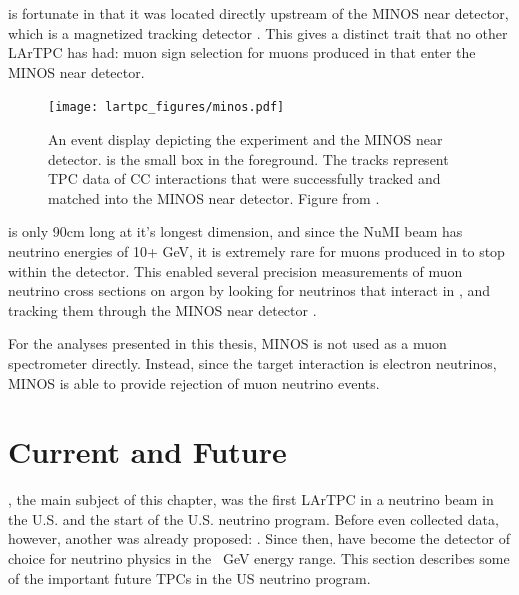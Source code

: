 \argoneut is fortunate in that it was located directly upstream of the MINOS near detector, which is a magnetized tracking detector \cite{Michael:2008bc}.  This gives \argoneut a distinct trait that no other LArTPC has had: muon sign selection for muons produced in \argoneut that enter the MINOS near detector.

\begin{figure}[htb]
  \centering
  \texttt{[image: lartpc\_figures/minos.pdf]}
  \caption[\argoneut and MINOS]{An event display depicting the \argoneut experiment and the MINOS near detector. \argoneut is the small box in the foreground.  The tracks represent TPC data of \numu CC interactions that were successfully tracked and matched into the MINOS near detector.  Figure from \cite{Anderson:2012vc}.}
  \label{fig:minos}
\end{figure}

\argoneut is only 90cm long at it's longest dimension, and since the NuMI beam has neutrino energies of 10+ GeV, it is extremely rare for muons produced in \argoneut to stop within the detector.  This enabled several precision measurements of muon neutrino cross sections on argon by looking for neutrinos that interact in \argoneut, and tracking them through the MINOS near detector \cite{Anderson:2011ce, Acciarri:2014isz}.

For the analyses presented in this thesis, MINOS is not used as a muon spectrometer directly.  Instead, since the target interaction is electron neutrinos, MINOS is able to provide rejection of muon neutrino events.

\FloatBarrier

\section{Current and Future \lartpcs}

\argoneut, the main subject of this chapter, was the first LArTPC in a neutrino beam in the U.S. and the start of the U.S. \lartpc neutrino program.  Before \argoneut even collected data, however, another \lartpc was already proposed: \uboone.  Since then, \lartpcs have become the detector of choice for neutrino physics in the ~GeV energy range.  This section describes some of the important future TPCs in the US neutrino program. 

\subsection{\label{sec:microboone} \uboone}

